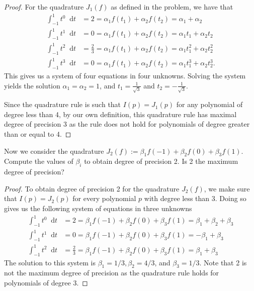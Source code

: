 \documentclass[12pt]{article}
\theoremstyle{definition}
\newenvironment{custompbm}[1]
  {\renewcommand\theproblem{#1}\problem}
  {\endproblem}
\newcommand*\diff{\mathop{}\!\mathrm{d}}
\begin{document}
\begin{proof}
  For the quadrature $J_1(f)$ as defined in the problem, we have that
  \begin{align*}
    \int_{-1}^{1} t^0 \diff{t} &= 2 = \alpha_1 f(t_1) + \alpha_2 f(t_2) = \alpha_1 + \alpha_2 \\
    \int_{-1}^{1} t^1 \diff{t} &= 0 = \alpha_1 f(t_1) + \alpha_2 f(t_2) = \alpha_1 t_1 + \alpha_2 t_2 \\
    \int_{-1}^{1} t^2 \diff{t} &= \frac{2}{3} = \alpha_1 f(t_1) + \alpha_2 f(t_2) = \alpha_1 t_1^2 + \alpha_2 t_2^2 \\
    \int_{-1}^{1} t^3 \diff{t} &= 0 = \alpha_1 f(t_1) + \alpha_2 f(t_2) = \alpha_1 t_1^3 + \alpha_2 t_2^3.
  \end{align*}
  This gives us a system of four equations in four unknowns. Solving the system
  yields the solution $\alpha_1 = \alpha_2 = 1$, and $t_1 = \frac{1}{\sqrt{3}}$ and
  $t_2 = -\frac{1}{\sqrt{3}}$.

  Since the quadrature rule is such that $I(p) = J_1(p)$ for any polynomial
  of degree less than 4, by our own definition, this quadrature rule has
  maximal degree of precision 3 as the rule does not hold for polynomials of
  degree greater than or equal to 4.
\end{proof}


\begin{custompbm}{9.4.2}
  Now we consider the quadrature $J_2(f):= \beta_1 f(-1) + \beta_2 f(0) + \beta_3 f(1)$.
  Compute the values of $\beta_i$ to obtain degree of precision 2. Is 2 the maximum
  degree of precision?
\end{custompbm}

\begin{proof}
  To obtain degree of precision 2 for the quadrature $J_2(f)$, we make sure that
  $I(p) = J_2(p)$ for every polynomial $p$ with degree less than 3. Doing so gives us
  the following system of equations in three unknowns
  \begin{align*}
    \int_{-1}^{1} t^0 \diff{t} &= 2 = \beta_1 f(-1) + \beta_2 f(0) + \beta_3 f(1) = \beta_1 + \beta_2 + \beta_3 \\
    \int_{-1}^{1} t^1 \diff{t} &= 0 = \beta_1 f(-1) + \beta_2 f(0) + \beta_3 f(1) = -\beta_1 + \beta_3 \\
    \int_{-1}^{1} t^2 \diff{t} &= \frac{2}{3} = \beta_1 f(-1) + \beta_2 f(0) + \beta_3 f(1) = \beta_1 + \beta_3
  \end{align*}
  The solution to this system is $\beta_1 = 1/3, \beta_2 = 4/3$, and $\beta_3 = 1/3$.
  Note that 2 is not the maximum degree of precision as the quadrature rule
  holds for polynomials of degree 3.

\end{proof}
\end{document}
